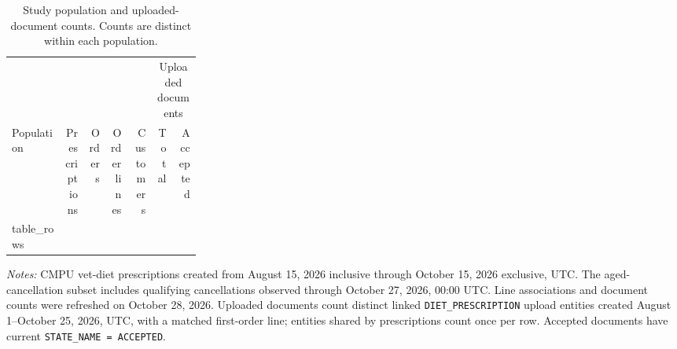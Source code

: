 \begin{table}[htbp]
\centering
\caption{Study population and uploaded-document counts. Counts are distinct within each population.}
\label{tab:study-population-counts}
\small
\begin{tabular}{@{}>{\raggedright\arraybackslash}p{0.28\linewidth}rrrrrr@{}}
\toprule
& & & & & \multicolumn{2}{c}{Uploaded documents} \\
\cmidrule(lr){6-7}
Population & Prescriptions & Orders & \shortstack[r]{Order\\lines} & Customers & Total & Accepted \\
\midrule
{{ table_rows }}
\bottomrule
\end{tabular}

\begin{minipage}{\linewidth}
\footnotesize
\textit{Notes:} CMPU vet-diet prescriptions created from August 15, 2026 inclusive
through October 15, 2026 exclusive, UTC. The aged-cancellation subset includes
qualifying cancellations observed through October 27, 2026, 00:00 UTC.
Line associations and document counts were refreshed on October 28, 2026.
Uploaded documents count distinct linked \texttt{DIET\_PRESCRIPTION} upload entities
created August 1--October 25, 2026, UTC, with a matched first-order line; entities
shared by prescriptions count once per row. Accepted documents have current
\texttt{STATE\_NAME = ACCEPTED}.
\end{minipage}
\end{table}
